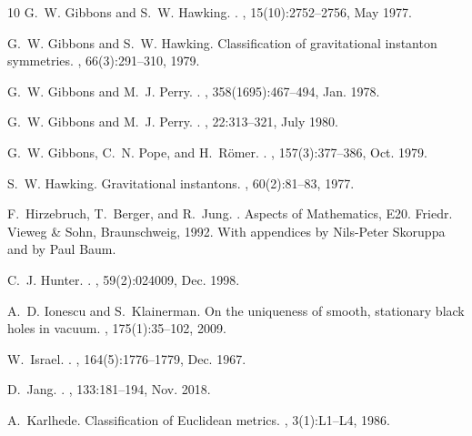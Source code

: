 \documentclass[a4paper,10pt,reqno]{amsart}
\theoremstyle{plain}
\numberwithin{equation}{section}
\begin{document}
\begin{thebibliography}{10}
G.~W. {Gibbons} and S.~W. {Hawking}.
.
\newblock {\em \prd}, 15(10):2752--2756, May 1977.

G.~W. Gibbons and S.~W. Hawking.
\newblock Classification of gravitational instanton symmetries.
, 66(3):291--310, 1979.

G.~W. {Gibbons} and M.~J. {Perry}.
.
,
  358(1695):467--494, Jan. 1978.

G.~W. {Gibbons} and M.~J. {Perry}.
.
\newblock {\em \prd}, 22:313--321, July 1980.

G.~W. {Gibbons}, C.~N. {Pope}, and H.~{R{\"o}mer}.
.
, 157(3):377--386, Oct. 1979.

S.~W. Hawking.
\newblock Gravitational instantons.
, 60(2):81--83, 1977.

F.~Hirzebruch, T.~Berger, and R.~Jung.
.
\newblock Aspects of Mathematics, E20. Friedr. Vieweg \& Sohn, Braunschweig,
  1992.
\newblock With appendices by Nils-Peter Skoruppa and by Paul Baum.

C.~J. {Hunter}.
.
\newblock {\em \prd}, 59(2):024009, Dec. 1998.

A.~D. Ionescu and S.~Klainerman.
\newblock On the uniqueness of smooth, stationary black holes in vacuum.
, 175(1):35--102, 2009.

W.~{Israel}.
.
, 164(5):1776--1779, Dec. 1967.

D.~{Jang}.
.
, 133:181--194, Nov. 2018.

A.~Karlhede.
\newblock Classification of {E}uclidean metrics.
, 3(1):L1--L4, 1986.


\end{thebibliography}
\end{document}
